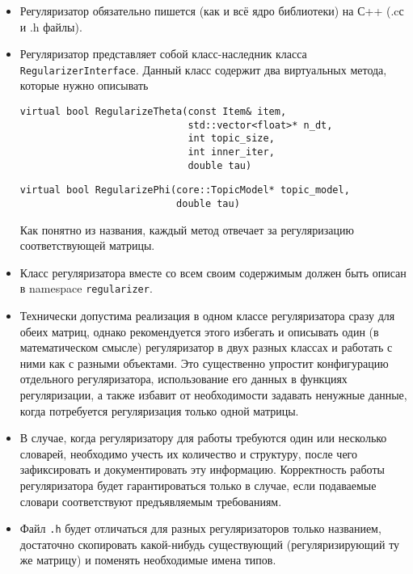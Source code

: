 \begin{itemize}
	\item Регуляризатор обязательно пишется (как и всё ядро библиотеки) на С++ (.cс и .h файлы).

	\item Регуляризатор представляет собой класс-наследник класса \verb'RegularizerInterface'. Данный класс содержит два виртуальных метода, которые нужно описывать
	
	\vspace{10pt}
	\verb|virtual bool RegularizeTheta(const Item& item, | \\
	\verb|                             std::vector<float>* n_dt,| \\
	\verb|                             int topic_size,| \\
	\verb|                             int inner_iter,| \\
	\verb|                             double tau)|
	
	\verb|virtual bool RegularizePhi(core::TopicModel* topic_model, | \\
	\verb|                           double tau)|
	\vspace{10pt}
	
	Как понятно из названия, каждый метод отвечает за регуляризацию соответствующей матрицы.
	
	\item Класс регуляризатора вместе со всем своим содержимым должен быть описан в namespace \verb'regularizer'.
	
	\item Технически допустима реализация в одном классе регуляризатора сразу для обеих матриц, однако рекомендуется этого избегать и описывать один (в математическом смысле) регуляризатор в двух разных классах и работать с ними как с разными объектами. Это существенно упростит конфигурацию отдельного регуляризатора, использование его данных в функциях регуляризации, а также избавит от необходимости задавать ненужные данные, когда потребуется регуляризация только одной матрицы.
	
	\item В случае, когда регуляризатору для работы требуются один или несколько словарей, необходимо учесть их количество и структуру, после чего зафиксировать и документировать эту информацию. Корректность работы регуляризатора будет гарантироваться только в случае, если подаваемые словари соответствуют предъявляемым требованиям.
	
	\item Файл \verb'.h' будет отличаться для разных регуляризаторов только названием, достаточно скопировать какой-нибудь существующий (регуляризирующий ту же матрицу) и поменять необходимые имена типов.
	

\end{itemize}
